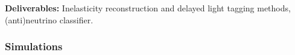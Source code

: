 \documentclass[a4paper,11pt]{article}
\begin{document}

\textbf{Deliverables:} Inelasticity reconstruction and delayed light tagging methods, (anti)neutrino classifier. \\

\subsubsection{Simulations}


\end{document}
